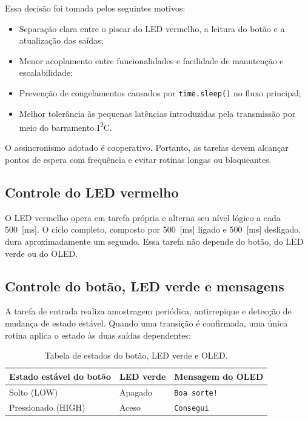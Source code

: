 \documentclass[12pt,a4paper]{article}
\begin{document}
Essa decisão foi tomada pelos seguintes motivos:

\begin{itemize}
  \item Separação clara entre o piscar do LED vermelho, a leitura do botão e a atualização das saídas;
  \item Menor acoplamento entre funcionalidades e facilidade de manutenção e escalabilidade;
  \item Prevenção de congelamentos causados por \texttt{time.sleep()} no fluxo principal;
  \item Melhor tolerância às pequenas latências introduzidas pela transmissão por meio do barramento I\textsuperscript{2}C.
\end{itemize}

O assincronismo adotado é cooperativo. Portanto, as tarefas devem alcançar pontos de espera com frequência e evitar rotinas longas ou bloqueantes.

\subsection{Controle do LED vermelho}

O LED vermelho opera em tarefa própria e alterna seu nível lógico a cada 500~[ms]. O ciclo completo, composto por 500~[ms] ligado e 500~[ms] desligado, dura aproximadamente um segundo. Essa tarefa não depende do botão, do LED verde ou do OLED.

\subsection{Controle do botão, LED verde e mensagens}

A tarefa de entrada realiza amostragem periódica, antirrepique e detecção de mudança de estado estável. Quando uma transição é confirmada, uma única rotina aplica o estado às duas saídas dependentes:

\begin{table}[htbp]
  \centering
  \caption{Tabela de estados do botão, LED verde e OLED.}
  \label{tab:estados}
  \begin{tabularx}{\textwidth}{@{}YYY@{}}
    \toprule
    Estado estável do botão & LED verde & Mensagem do OLED \\
    \midrule
    Solto (LOW) & Apagado & \texttt{Boa sorte!} \\
    Pressionado (HIGH) & Aceso & \texttt{Consegui} \\
    \bottomrule
  \end{tabularx}
\end{table}
\end{document}

